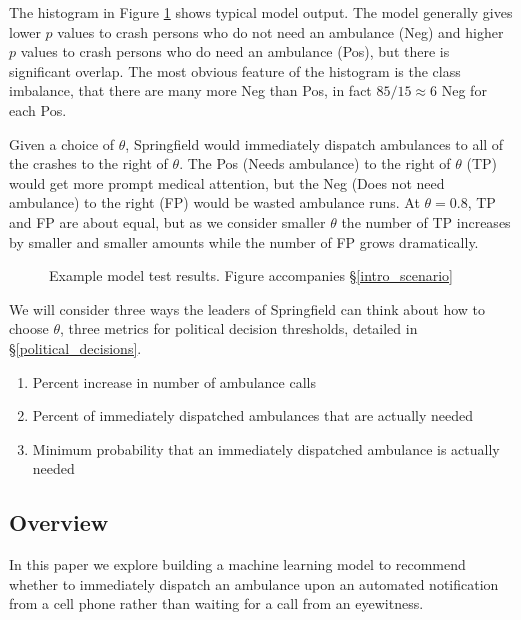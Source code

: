 The histogram in Figure \ref{intro_ideal} shows typical model output.  The model generally gives lower $p$ values to crash persons who do not need an ambulance (Neg) and higher $p$ values to crash persons who do need an ambulance (Pos), but there is significant overlap.  The most obvious feature of the histogram is the class imbalance, that there are many more Neg than Pos, in fact $85/15 \approx 6$ Neg for each Pos.  

  Given a choice of $\theta$, Springfield would immediately dispatch ambulances to all of the crashes to the right of $\theta$.  The Pos (Needs ambulance) to the right of $\theta$ (TP) would get more prompt medical attention, but the Neg (Does not need ambulance) to the right (FP) would be wasted ambulance runs.  At $\theta = 0.8$, TP and FP are about equal, but as we consider smaller $\theta$ the number of TP increases by smaller and smaller amounts while the number of FP grows dramatically.  

\begin{figure}[h]
\centering
		
\caption{\normalfont\normalsize Example model test results.  Figure accompanies \S\ref{intro_scenario}}
\label{intro_ideal}
\end{figure}

\FloatBarrier

We will consider three ways the leaders of Springfield can think about how to choose $\theta$, three metrics for political decision thresholds, detailed in \S \ref{political_decisions}.

\begin{enumerate}
	\item Percent increase in number of ambulance calls
	\item Percent of immediately dispatched ambulances that are actually needed
	\item Minimum probability that an immediately dispatched ambulance is actually needed
\end{enumerate}

\subsection{Overview}
\label{intro_overview}

In this paper we explore building a machine learning model to recommend whether to immediately dispatch an ambulance upon an automated notification from a cell phone rather than waiting for a call from an eyewitness.

